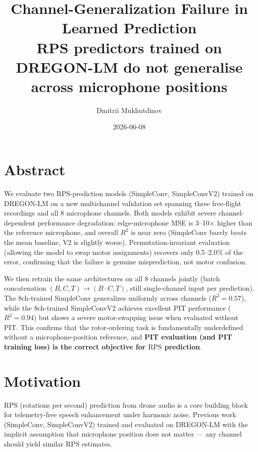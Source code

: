 \documentclass[11pt,a4paper]{article}
\title{\textbf{Channel-Generalization Failure in Learned \rps{} Prediction}\\
  \large RPS predictors trained on DREGON-LM do not generalise across microphone positions}
\author{Dmitrii Mukhutdinov}
\date{2026-06-08}
\newcommand{\rps}{\ensuremath{\mathrm{RPS}}}
\newcommand{\rsq}{\ensuremath{R^{2}}}
\begin{document}
\maketitle

\section*{Abstract}

We evaluate two \rps{}-prediction models (SimpleConv, SimpleConvV2) trained on DREGON-LM
on a new multichannel validation set spanning three free-flight recordings and all
8 microphone channels. Both models exhibit severe channel-dependent performance
degradation: edge-microphone MSE is 3--10$\times$ higher than the reference microphone,
and overall \rsq{} is near zero (SimpleConv barely beats the mean baseline, V2 is
slightly worse). Permutation-invariant evaluation (allowing the model to swap motor
assignments) recovers only 0.5--2.0\% of the error, confirming that the failure is
genuine misprediction, not motor confusion.

We then retrain the same architectures on all 8 channels jointly (batch concatenation
$(B, C, T) \to (B \cdot C, T)$, still single-channel input per prediction). The
8ch-trained SimpleConv generalizes uniformly across channels ($\rsq = 0.57$), while
the 8ch-trained SimpleConvV2 achieves excellent PIT performance ($\rsq = 0.94$) but
shows a severe motor-swapping issue when evaluated without PIT. This confirms that
the rotor-ordering task is fundamentally underdefined without a microphone-position
reference, and \textbf{PIT evaluation (and PIT training loss) is the correct objective for
\rps{} prediction}.

\section{Motivation}

\rps{} (rotations per second) prediction from drone audio is a core building block
for telemetry-free speech enhancement under harmonic noise. Previous work
(SimpleConv, SimpleConvV2) trained and evaluated on DREGON-LM with the implicit
assumption that microphone position does not matter --- any channel should yield
similar \rps{} estimates.
\end{document}
